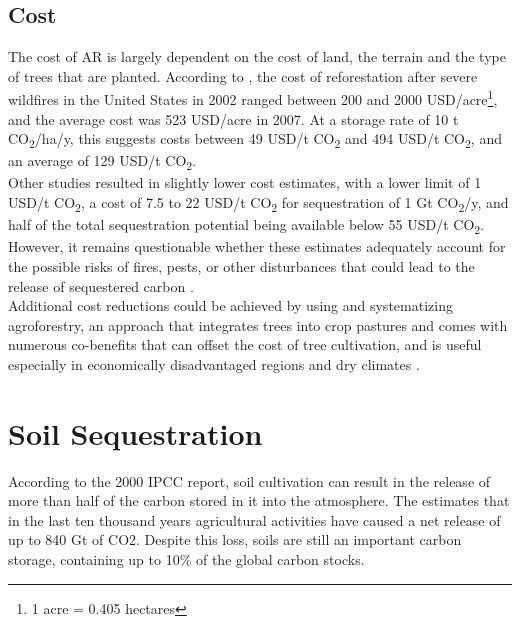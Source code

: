 \subsection*{Cost}
The cost of AR is largely dependent on the cost of land, the terrain and the type of trees that are planted. According to \textcite{Gorte2009U.S.Sequestration}, the cost of reforestation after severe wildfires in the United States in 2002 ranged between 200 and 2000 USD/acre\footnote{1 acre = 0.405 hectares}, and the average cost was 523 USD/acre in 2007. At a storage rate of 10 t CO\textsubscript{2}/ha/y, this suggests costs between 49 USD/t CO\textsubscript{2}  and  494 USD/t CO\textsubscript{2}, and an average of 129 USD/t CO\textsubscript{2}.\\Other studies resulted in slightly lower cost estimates, with a lower limit of 1 USD/t CO\textsubscript{2}, a cost of 7.5 to 22 USD/t CO\textsubscript{2} for sequestration of 1 Gt CO\textsubscript{2}/y, and half of the total sequestration potential being available below 55 USD/t CO\textsubscript{2}. However, it remains questionable whether these estimates adequately account for the possible risks of fires, pests, or other disturbances that could lead to the release of sequestered carbon \parencite[41-42]{NRC2015ClimateSequestration}.\\Additional cost reductions could be achieved by using and systematizing agroforestry, an approach that integrates trees into crop pastures and comes with numerous co-benefits that can offset the cost of tree cultivation, and is useful especially in economically disadvantaged regions and dry climates \parencite{Reij2014ImprovingAchievable}.

\section{Soil Sequestration}
According to the 2000 IPCC report, soil cultivation can result in the release of more than half of the carbon stored in it into the atmosphere. The \textcite{NRC2015ClimateSequestration} estimates that in the last ten thousand years agricultural activities have caused a net release of up to 840 Gt of CO2. Despite this loss, soils are still an important carbon storage, containing up to 10\% of the global carbon stocks.
